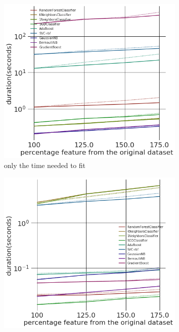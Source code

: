 \documentclass[a4paper,10pt]{article}
\begin{document}
\begin{figure}[H]
	\centering	
	\begin{subfigure}[b]{0.45\textwidth}
		\includegraphics[width=\textwidth]{images/scalability/FeatAddDupRandClass.png}
		\caption{only the time needed to fit }
		\label{fig:SADRC}
	\end{subfigure}
	\begin{subfigure}[b]{0.45\textwidth}
		\includegraphics[width=\textwidth]{images/scalability/FeatAddDupRandPred.png}

\end{subfigure}
\end{figure}
\end{document}
